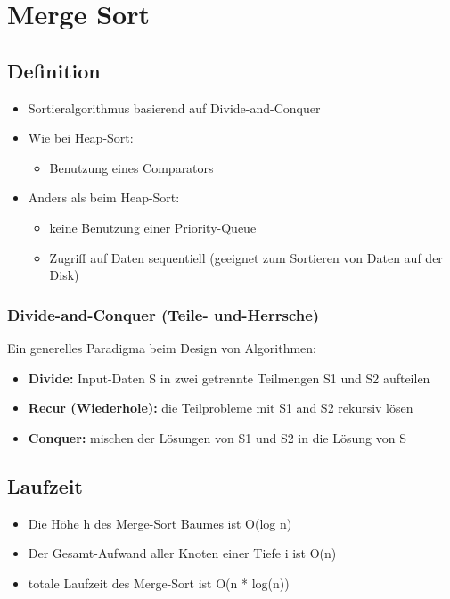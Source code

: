 \section{Merge Sort}

\subsection{Definition}
\begin{itemize}
    \item Sortieralgorithmus basierend auf Divide-and-Conquer
    \item Wie bei Heap-Sort:
    \begin{itemize}
        \item Benutzung eines Comparators
    \end{itemize}
    \item Anders als beim Heap-Sort:
    \begin{itemize}
        \item keine Benutzung einer Priority-Queue
        \item Zugriff auf Daten sequentiell (geeignet zum Sortieren von Daten auf der Disk)
    \end{itemize}
\end{itemize}

\subsubsection{Divide-and-Conquer (Teile- und-Herrsche)}
Ein generelles Paradigma beim Design von Algorithmen:
\begin{itemize}
    \item \textbf{Divide:} Input-Daten S in zwei getrennte Teilmengen S1 und S2 aufteilen
    \item \textbf{Recur (Wiederhole):} die Teilprobleme mit S1 and S2 rekursiv lösen
    \item \textbf{Conquer:} mischen der Lösungen von S1 und S2 in die Lösung von S
\end{itemize}

\subsection{Laufzeit}
\begin{itemize}
    \item Die Höhe h des Merge-Sort Baumes ist O(log n)
    \item Der Gesamt-Aufwand aller Knoten einer Tiefe i ist O(n)
    \item totale Laufzeit des Merge-Sort ist O(n * log(n))
\end{itemize}


